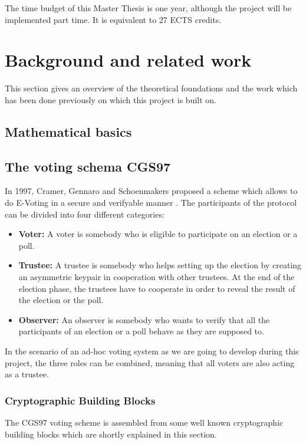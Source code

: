 \documentclass[numbers=noenddot, abstract=on]{scrreprt}
\begin{document}
The time budget of this Master Thesis is one year, although the project will be
implemented part time. It is equivalent to 27 ECTS credits. 

\chapter{Background and related work}
\label{cha:brw}
This section gives an overview of the theoretical foundations and the work which
has been done previously on which this project is built on.

\section{Mathematical basics}
\label{sec:mathbasics}


\section{The voting schema CGS97}
\label{sec:CGS97}
In 1997, Cramer, Gennaro and Schoenmakers proposed a scheme which allows to
do E-Voting in a secure and verifyable manner \cite{CGS97}. The participants of
the protocol can be divided into four different categories:
\begin{itemize}
  \item \textbf{Voter: } A voter is somebody who is eligible to participate on
  an election or a poll. 
  \item \textbf{Trustee: } A trustee is somebody who helps setting up the
  election by creating an asymmetric keypair in cooperation with other trustees.
  At the end of the election phase, the trustees have to cooperate in order to
  reveal the result of the election or the poll.
  \item \textbf{Observer: } An observer is somebody who wants to verify that all
  the participants of an election or a poll behave as they are supposed to.
\end{itemize}

In the scenario of an ad-hoc voting system as we are going to develop during
this project, the three roles can be combined, meaning that all voters are also
acting as a trustee. 

\subsection{Cryptographic Building Blocks}
\label{sec:buildingblocks}
The CGS97 voting scheme is assembled from some well known cryptographic building
blocks which are shortly explained in this section.
\end{document}
